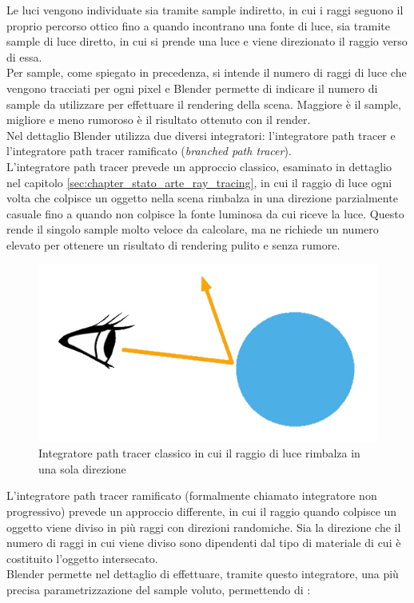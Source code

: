 Le luci vengono individuate sia tramite sample indiretto, in cui i raggi seguono il proprio percorso ottico fino a quando incontrano una fonte di luce, sia tramite sample di luce diretto, in cui si prende una luce e viene direzionato il raggio verso di essa.
\\
Per sample, come spiegato in precedenza, si intende il numero di raggi di luce che vengono tracciati per ogni pixel e Blender permette di indicare il numero di sample da utilizzare per effettuare il rendering della scena. Maggiore è il sample, migliore e meno rumoroso è il risultato ottenuto con il render.
\\
Nel dettaglio Blender utilizza due diversi integratori: l’integratore path tracer e l’integratore path tracer ramificato (\emph{branched path tracer}).
\\
L’integratore path tracer prevede un approccio classico, esaminato in dettaglio nel capitolo \ref{sec:chapter_stato_arte_ray_tracing}, in cui il raggio di luce ogni volta che colpisce un oggetto nella scena rimbalza in una direzione parzialmente casuale fino a quando non colpisce la fonte luminosa da cui riceve la luce.
Questo rende il singolo sample molto veloce da calcolare, ma ne richiede un numero elevato per ottenere un risultato di rendering pulito e senza rumore.
\begin{figure}[htb]
 \centering
 \includegraphics[width=0.6\linewidth]{images/chapter_tecnologie_abilitanti/tecnologie_abilitanti_sferaluce1.jpg}\hfill
 \caption[Integratore path tracer classico]{Integratore path tracer classico in cui il raggio di luce rimbalza in una sola direzione}
 \label{fig:tecnologie_abilitanti_sferaluce1}
\end{figure}
L’integratore path tracer ramificato (formalmente chiamato integratore non progressivo) prevede un approccio differente, in cui il raggio quando colpisce un oggetto  viene diviso in più raggi con direzioni randomiche. Sia la direzione che il numero di raggi in cui viene diviso sono dipendenti dal tipo di materiale di cui è costituito l’oggetto intersecato.
\\
Blender permette nel dettaglio di effettuare, tramite questo integratore, una più precisa parametrizzazione del sample voluto, permettendo di :
